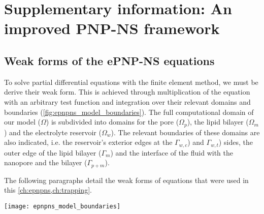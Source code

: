 %
\chapter[SI: An improved PNP-NS framework]%
        {Supplementary information: An improved PNP-NS framework}
%
\label{ch:epnpns_appendix}

\begin{shaded}
\newpage
\end{shaded}


\section{Weak forms of the {ePNP-NS} equations}
%
\label{sec:epnpns_appendix:weak_forms}
%

To solve partial differential equations with the finite element method, we must be derive their weak form.
This is achieved through multiplication of the equation with an arbitrary test function and integration over
their relevant domains and boundaries (\cref{fig:epnpns_model_boundaries}). The full computational domain of
our model ($\Omega$) is subdivided into domains for the pore ($\Omega_p$), the lipid bilayer ($\Omega_m$) and
the electrolyte reservoir ($\Omega_w$). The relevant boundaries of these domains are also indicated, i.e. the
reservoir's exterior edges at the \cisi{} $\Gamma_{w,c}$) and \transi{} $\Gamma_{w,t}$) sides, the outer edge
of the lipid bilayer ($\Gamma_{m}$) and the interface of the fluid with the nanopore and the bilayer
($\Gamma_{p+m}$).

The following paragraphs detail the weak forms of equations that were used in this
\cref{ch:epnpns,ch:trapping}.

%
\begin{figure*}[t]
  \centering
  \texttt{[image: epnpns\_model\_boundaries]}
  
  \caption[Computational domains and boundaries.]%
  {\textbf{Computational domains and boundaries.}
    The full computational domain ($\Omega$) of the model is subdivided into various subdomains---comprising
    the reservoir ($\Omega_w$), the lipid bilayer ($\Omega_m$) and the pore ($\Omega_p$)---and their limiting
    boundaries---the exterior boundary at the \cisi{} ($\Gamma_{w,c}$) \transi{} and the \transi{}
    ($\Gamma_{w,t}$) sides of the reservoir, the exterior boundary of the membrane ($\Gamma_m$) and the
    interior boundary between the reservoir on the one hand, and the pore and membrane on the other
    ($\Gamma_{p+m}$).
  }\label{fig:epnpns_model_boundaries}
\end{figure*}
%


